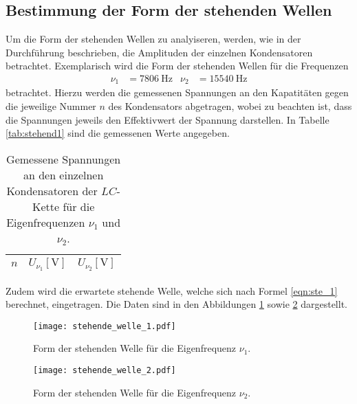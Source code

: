 \subsection{Bestimmung der Form der stehenden Wellen}
Um die Form der stehenden Wellen zu analyiseren, werden, wie in der Durchführung beschrieben, die Amplituden der einzelnen Kondensatoren betrachtet.
Exemplarisch wird die Form der stehenden Wellen für die Frequenzen
\begin{align*}
  \nu_1 &= \SI{7806}{\hertz} & \nu_2 &= \SI{15540}{\hertz}
\end{align*}
betrachtet.
Hierzu werden die gemessenen Spannungen an den Kapatitäten gegen die jeweilige Nummer $n$ des Kondensators abgetragen, wobei zu beachten ist, dass die Spannungen jeweils den Effektivwert der Spannung darstellen.
In Tabelle \ref{tab:stehend1} sind die gemessenen Werte angegeben.
\begin{table}
  \centering
  \caption{Gemessene Spannungen an den einzelnen Kondensatoren der $LC$-Kette für die Eigenfrequenzen $\nu_1$ und $\nu_2$.}
  \label{tab:stehend}
  \begin{tabular}{c c c}
    \toprule
    {$n$} & {$U_{\nu_1} [\si{\volt}]$} & {$U_{\nu_2} [\si{\volt}]$}\\
    \midrule
    
    \bottomrule
  \end{tabular}
\end{table}

Zudem wird die erwartete stehende Welle, welche sich nach Formel \ref{eqn:ste_1} berechnet, eingetragen.
Die Daten sind in den Abbildungen \ref{fig:stehend1} sowie \ref{fig:stehend2} dargestellt.

\begin{figure}[H]
  \centering
  \texttt{[image: stehende\_welle\_1.pdf]}
  \caption{Form der stehenden Welle für die Eigenfrequenz $\nu_1$.}
  \label{fig:stehend1}
\end{figure}

\begin{figure}[H]
  \centering
  \texttt{[image: stehende\_welle\_2.pdf]}
  \caption{Form der stehenden Welle für die Eigenfrequenz $\nu_2$.}
  \label{fig:stehend2}
\end{figure}

